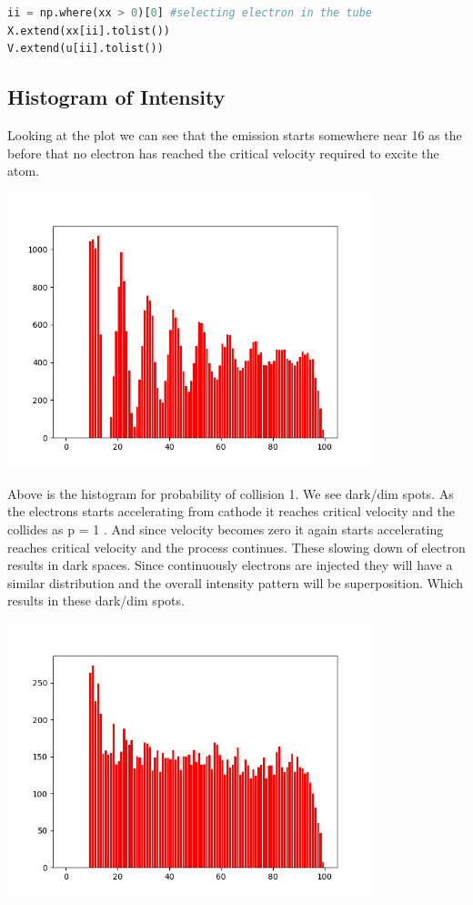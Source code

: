 \documentclass[a4paper]{article}
\begin{document}
\begin{lstlisting}[language=Python]
ii = np.where(xx > 0)[0] #selecting electron in the tube	
X.extend(xx[ii].tolist())
V.extend(u[ii].tolist())

\end{lstlisting}

\subsection{Histogram of Intensity}
Looking at the plot we can see that the emission starts somewhere near 16 as the before that no electron has reached the critical velocity required to excite the atom. 
\begin{center}
\includegraphics[width=0.8\textwidth]{Figure_1-1.png}
\end{center}
Above is the histogram for probability of collision 1. We see dark/dim spots. As the electrons starts accelerating from cathode it reaches critical velocity and the collides as p = 1 . And since velocity becomes zero it again starts accelerating reaches critical velocity and the process continues. These slowing down of electron results in dark spaces. Since continuously electrons are injected they will have a similar distribution and the overall intensity pattern will be superposition. Which results in these dark/dim spots.
\begin{center}
\includegraphics[width=0.8\textwidth]{Figure_1-2_5.png}
\end{center}
\end{document}
